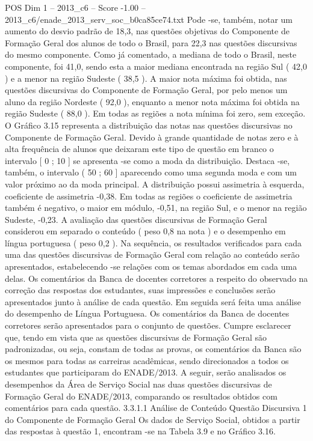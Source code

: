 \begin{textsample}{POS Dim 1 – 2013\_c6 – Score -1.00 – 2013\_c6/enade\_2013\_serv\_soc\_b0ca85ce74.txt}
Pode -se, também, notar um aumento do desvio padrão de 18,3, nas questões objetivas do Componente de Formação Geral dos alunos de todo o Brasil, para 22,3 nas questões discursivas do mesmo componente.
Como já comentado, a mediana de todo o Brasil, neste componente, foi 41,0, sendo esta a maior mediana encontrada na região Sul ( 42,0 ) e a menor na região Sudeste ( 38,5 ).
A maior nota máxima foi obtida, nas questões discursivas do Componente de Formação Geral, por pelo menos um aluno da região Nordeste ( 92,0 ), enquanto a menor nota máxima foi obtida na região Sudeste ( 88,0 ).
Em todas as regiões a nota mínima foi zero, sem exceção.
O Gráfico 3.15 representa a distribuição das notas nas questões discursivas no Componente de Formação Geral.
Devido à grande quantidade de notas zero e à alta frequência de alunos que deixaram este tipo de questão em branco o intervalo [ 0 ; 10 ] se apresenta -se como a moda da distribuição.
Destaca -se, também, o intervalo ( 50 ; 60 ] aparecendo como uma segunda moda e com um valor próximo ao da moda principal.
A distribuição possui assimetria à esquerda, coeficiente de assimetria -0,38.
Em todas as regiões o coeficiente de assimetria também é negativo, o maior em módulo, -0,51, na região Sul, e o menor na região Sudeste, -0,23.
A avaliação das questões discursivas de Formação Geral considerou em separado o conteúdo ( peso 0,8 na nota ) e o desempenho em língua portuguesa ( peso 0,2 ).
Na sequência, os resultados verificados para cada uma das questões discursivas de Formação Geral com relação ao conteúdo serão apresentados, estabelecendo -se relações com os temas abordados em cada uma delas.
Os comentários da Banca de docentes corretores a respeito do observado na correção das respostas dos estudantes, suas impressões e conclusões serão apresentados junto à análise de cada questão.
Em seguida será feita uma análise do desempenho de Língua Portuguesa.
Os comentários da Banca de docentes corretores serão apresentados para o conjunto de questões.
Cumpre esclarecer que, tendo em vista que as questões discursivas de Formação Geral são padronizadas, ou seja, constam de todas as provas, os comentários da Banca são os mesmos para todas as carreiras acadêmicas, sendo direcionados a todos os estudantes que participaram do ENADE/2013.
A seguir, serão analisados os desempenhos da Área de Serviço Social nas duas questões discursivas de Formação Geral do ENADE/2013, comparando os resultados obtidos com comentários para cada questão. 3.3.1.1 Análise de Conteúdo Questão Discursiva 1 do Componente de Formação Geral Os dados de Serviço Social, obtidos a partir das respostas à questão 1, encontram -se na Tabela 3.9 e no Gráfico 3.16.

\end{textsample}
